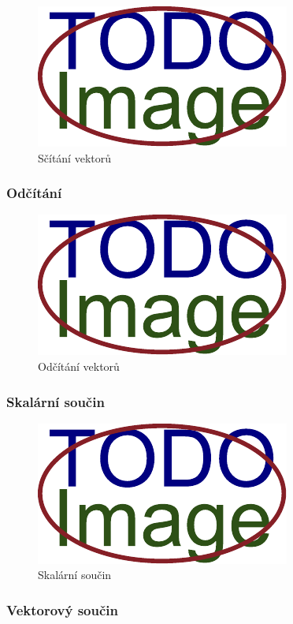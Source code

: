 \begin{figure}[H]
	\centering
	\includegraphics[width=.33\linewidth]{obrazky-figures/placeholder.pdf}
	\caption{Sčítání vektorů}
	\label{fig:lineární-algebra:sčítání}
\end{figure}

\subsubsection*{Odčítání}

\begin{figure}[H]
	\centering
	\includegraphics[width=.33\linewidth]{obrazky-figures/placeholder.pdf}
	\caption{Odčítání vektorů}
	\label{fig:lineární-algebra:odčítání}
\end{figure}

\subsubsection*{Skalární součin}

\begin{figure}[H]
	\centering
	\includegraphics[width=.33\linewidth]{obrazky-figures/placeholder.pdf}
	\caption{Skalární součin}
	\label{fig:lineární-algebra:dot}
\end{figure}

\subsubsection*{Vektorový součin}

